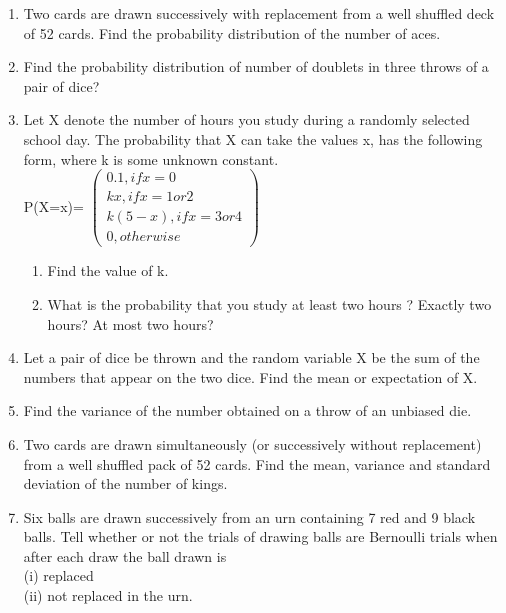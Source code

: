 \begin{enumerate}[label=\arabic*.,ref=\thesubsection.\theenumi]
\item Two cards are drawn successively with replacement from a well shuffled deck of 52 cards. Find the probability distribution of the number of aces.\\

\item Find the probability distribution of number of doublets in three throws of a pair of dice?\\

\item Let X denote the number of hours you study during a randomly selected school day. The probability that X can take the values x, has the following form, where k is some unknown constant.\\
P(X=x)= $\begin{pmatrix} 0.1, if x= 0 \\ kx,if x= 1 or 2 \\ k(5-x), if x= 3 or 4 \\ 0, otherwise \end{pmatrix}$
\begin{enumerate}
\item  Find the value of k.
\item  What is the probability that you study at least two hours ? Exactly two hours? At
most two hours?
\end{enumerate}

\item Let a pair of dice be thrown and the random variable X be the sum of the numbers that appear on the two dice. Find the mean or expectation of X.\\

\item Find the variance of the number obtained on a throw of an unbiased die.\\

\item Two cards are drawn simultaneously (or successively without replacement) from a well shuffled pack of 52 cards. Find the mean, variance and standard deviation of the number of kings.\\

\item Six balls are drawn successively from an urn containing 7 red and 9 black balls. Tell whether or not the trials of drawing balls are Bernoulli trials when after each draw the ball drawn is\\
(i) replaced \\
(ii) not replaced in the urn.\\


\end{enumerate}
